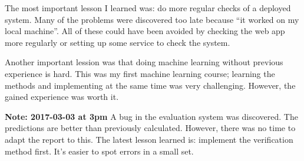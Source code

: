 The most important lesson I learned was: do more regular checks of a deployed system. Many of the problems were discovered too late because ``it worked on my local machine''. All of these could have been avoided by checking the web app more regularly or setting up some service to check the system.

Another important lession was that doing machine learning without previous experience is hard. This was my first machine learning course; learning the methods and implementing at the same time was very challenging. However, the gained experience was worth it.

\textbf{Note: 2017-03-03 at 3pm} A bug in the evaluation system was discovered. The predictions are better than previously calculated. However, there was no time to adapt the report to this. The latest lesson learned is: implement the verification method first. It's easier to spot errors in a small set.